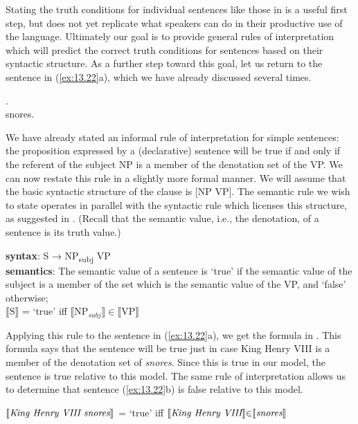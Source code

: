 Stating the truth conditions for individual sentences like those in  is a useful first step, but does not yet replicate what speakers can do in their productive use of the language. Ultimately our goal is to provide general rules of interpretation which will predict the correct truth conditions for sentences based on their syntactic structure. As a further step toward this goal, let us return to the sentence in (\ref{ex:13.22}a), which we have already discussed several times.


\ea \label{ex:13.22}
.\\
  {snores}.
                       \z
\z


We have already stated an informal rule of interpretation for simple sentences: the proposition expressed by a (declarative) sentence will be true if and only if the referent of the subject NP is a member of the denotation set of the VP. We can now restate this rule in a slightly more formal manner. We will assume that the basic syntactic structure of the clause is [NP VP]. The semantic rule we wish to state operates in parallel with the syntactic rule which licenses this structure, as suggested in . (Recall that the semantic value, i.e., the denotation, of a sentence is its truth value.)


\ea \label{ex:13.23}
\textbf{syntax}: S  →  NP\textsubscript{subj}  VP\\
\textbf{semantics}: The semantic value of a sentence is ‘true’ if the semantic value of the subject is a member of the set which is the semantic value of the VP, and ‘false’ otherwise;\\
{}$\llbracket\text{S}\rrbracket$  = ‘true’  iff  $\llbracket\text{NP}_{subj}\rrbracket {\in} \llbracket\text{VP}\rrbracket$ 
\z


Applying this rule to the sentence in (\ref{ex:13.22}a), we get the formula in . This formula says that the sentence will be true just in case King Henry VIII is a member of the denotation set of \textit{snores}. Since this is true in our model, the sentence is true relative to this model. The same rule of interpretation allows us to determine that sentence (\ref{ex:13.22}b) is false relative to this model.


\ea \label{ex:13.24}
{}$\llbracket\text{\itshape King Henry VIII snores}\rrbracket$  = ‘true’  iff  $\llbracket\text{\itshape King Henry VIII}\rrbracket {\in} \llbracket\text{\itshape  snores}\rrbracket$ 
\z


